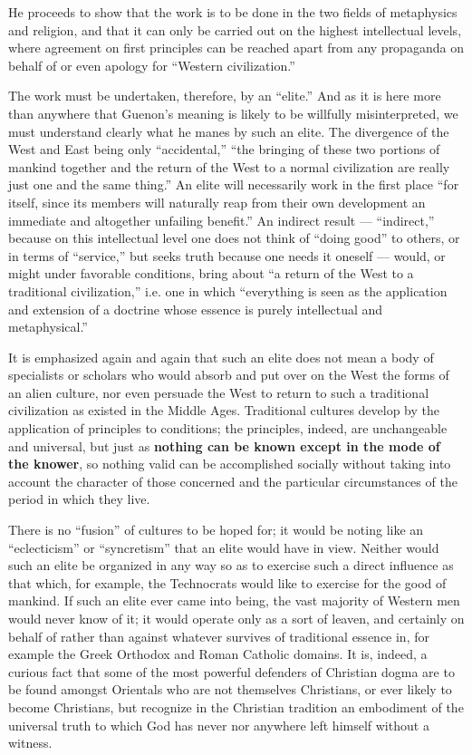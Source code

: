 He proceeds to show that the work is to be done in the two fields of metaphysics and religion, and that it can only be carried out on the highest intellectual levels, where agreement on first principles can be reached apart from any propaganda on behalf of or even apology for ``Western civilization.''

The work must be undertaken, therefore, by an ``elite.'' And as it is here more than anywhere that Guenon's meaning is likely to be willfully misinterpreted, we must understand clearly what he manes by such an elite. The divergence of the West and East being only ``accidental,'' ``the bringing of these two portions of mankind together and the return of the West to a normal civilization are really just one and the same thing.'' An elite will necessarily work in the first place ``for itself, since its members will naturally reap from their own development an immediate and altogether unfailing benefit.'' An indirect result --- ``indirect,'' because on this intellectual level one does not think of ``doing good'' to others, or in terms of ``service,'' but seeks truth because one needs it oneself --- would, or might under favorable conditions, bring about ``a return of the West to a traditional civilization,'' i.e. one in which ``everything is seen as the application and extension of a doctrine whose essence is purely intellectual and metaphysical.''

It is emphasized again and again that such an elite does not mean a body of specialists or scholars who would absorb and put over on the West the forms of an alien culture, nor even persuade the West to return to such a traditional civilization as existed in the Middle Ages. Traditional cultures develop by the application of principles to conditions; the principles, indeed, are unchangeable and universal, but just as \textbf{nothing can be known except in the mode of the knower}, so nothing valid can be accomplished socially without taking into account the character of those concerned and the particular circumstances of the period in which they live.

There is no ``fusion'' of cultures to be hoped for; it would be noting like an ``eclecticism'' or ``syncretism'' that an elite would have in view. Neither would such an elite be organized in any way so as to exercise such a direct influence as that which, for example, the Technocrats would like to exercise for the good of mankind. If such an elite ever came into being, the vast majority of Western men would never know of it; it would operate only as a sort of leaven, and certainly on behalf of rather than against whatever survives of traditional essence in, for example the Greek Orthodox and Roman Catholic domains. It is, indeed, a curious fact that some of the most powerful defenders of Christian dogma are to be found amongst Orientals who are not themselves Christians, or ever likely to become Christians, but recognize in the Christian tradition an embodiment of the universal truth to which God has never nor anywhere left himself without a witness.

